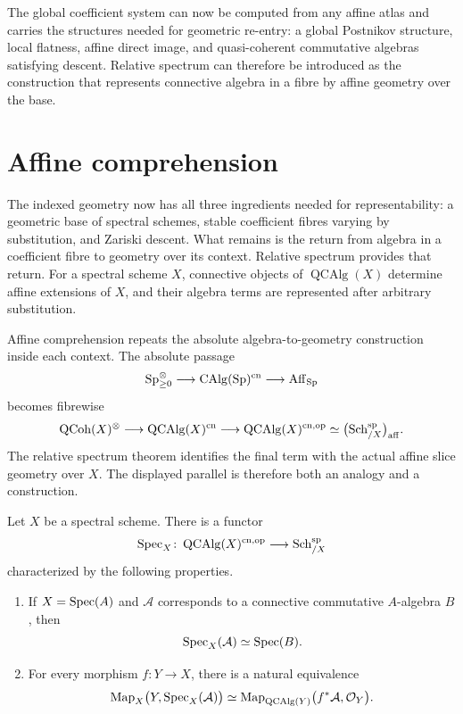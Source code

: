 The global coefficient system can now be computed from any affine atlas and
carries the structures needed for geometric re-entry: a global Postnikov
structure, local flatness, affine direct image, and quasi-coherent
commutative algebras satisfying descent. Relative spectrum can therefore be
introduced as the construction that represents connective algebra in a fibre
by affine geometry over the base.

\section{Affine comprehension}
\label{sec:affine-comprehension}

The indexed geometry now has all three ingredients needed for
representability: a geometric base of spectral schemes, stable coefficient
fibres varying by substitution, and Zariski descent. What remains is the
return from algebra in a coefficient fibre to geometry over its context.
Relative spectrum provides that return. For a spectral scheme \(X\),
connective objects of \(\operatorname{QCAlg}(X)\) determine affine
extensions of \(X\), and their algebra terms are represented after arbitrary
substitution.

\begin{remark}
\label{rem:relative-algebraic-geometry-in-context}
Affine comprehension repeats the absolute algebra-to-geometry construction
inside each context. The absolute passage
\[
    \operatorname{Sp}_{\geq0}^\otimes
    \longrightarrow
    \operatorname{CAlg}(\operatorname{Sp})^{\mathrm{cn}}
    \longrightarrow
    \operatorname{Aff}_{\operatorname{Sp}}
\]
becomes fibrewise
\[
    \operatorname{QCoh}(X)^\otimes
    \longrightarrow
    \operatorname{QCAlg}(X)^{\mathrm{cn}}
    \longrightarrow
    \operatorname{QCAlg}(X)^{\mathrm{cn},\mathrm{op}}
    \simeq
    \bigl(\operatorname{Sch}^{\mathrm{sp}}_{/X}\bigr)_{\mathrm{aff}}.
\]
The relative spectrum theorem identifies the final term with the actual
affine slice geometry over \(X\). The displayed parallel is therefore both an
analogy and a construction.
\end{remark}



\begin{theorem}
\label{thm:relative-spectrum-construction}
Let \(X\) be a spectral scheme. There is a functor
\[
    \operatorname{Spec}_X
    \colon
    \operatorname{QCAlg}(X)^{\mathrm{cn},\mathrm{op}}
    \longrightarrow
    \operatorname{Sch}^{\mathrm{sp}}_{/X}
\]
characterized by the following properties.
\begin{enumerate}[label=(\roman*)]
    \item If \(X=\operatorname{Spec}(A)\) and \(\mathcal A\) corresponds to a connective
    commutative \(A\)-algebra \(B\), then
    \[
        \operatorname{Spec}_X(\mathcal A)\simeq\operatorname{Spec}(B).
    \]

    \item For every morphism \(f:Y\to X\), there is a natural equivalence
    \[
        \operatorname{Map}_X\bigl(Y,\operatorname{Spec}_X(\mathcal A)\bigr)
        \simeq
        \operatorname{Map}_{\operatorname{QCAlg}(Y)}
        \bigl(f^*\mathcal A,\mathcal O_Y\bigr).
    \]
\end{enumerate}
\end{theorem}

